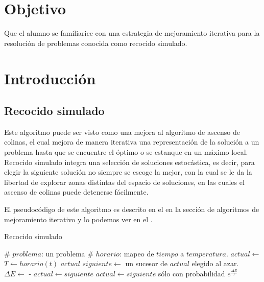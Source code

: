 \section{Objetivo}

Que el alumno se familiarice con una estrategia de mejoramiento iterativa para la resolución de problemas conocida como recocido simulado.



\section{Introducción}

\subsection{Recocido simulado}

Este algoritmo puede ser visto como una mejora al algoritmo de ascenso de colinas, el cual mejora de manera iterativa una representación de la solución a un problema hasta que se encuentre el óptimo o se estanque en un máximo local.  Recocido simulado integra una selección de soluciones estocástica, es decir, para elegir la siguiente solución no siempre se escoge la mejor, con la cual se le da la libertad de explorar zonas distintas del espacio de soluciones, en las cuales el ascenso de colinas puede detenerse fácilmente.

El pseudocódigo de este algoritmo es descrito en el \cite{Russell2010} en la sección de algoritmos de mejoramiento iterativo y lo podemos ver en el .

\begin{algorithm}
 \caption{Recocido simulado}\label{alg:annealing}
 \begin{algorithmic}
    \State \# $problema$: un problema
    \State \# $horario$: mapeo de $tiempo$ a $temperatura$.
    \State $actual \leftarrow $ 
      \State $T \leftarrow horario(t)$
       \Return $actual$ \EndIf
      \State $siguiente \leftarrow$ un sucesor de $actual$ elegido al azar.
      \State $\Delta E \leftarrow$  - 
        \State $actual \leftarrow siguiente$
      \Else
        \State $actual \leftarrow siguiente$ sólo con probabilidad $e^{\frac{\Delta E}{T}}$
      \EndIf
    \EndFor
  \EndFunction
 \end{algorithmic}
\end{algorithm}



